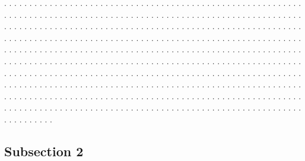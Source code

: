 \documentclass[twocolumn]{revtex4}
\begin{document}
. . . . . . . . . . . . . . . . . . . . . . . . . . . . . . . . . . . . . . . .
. . . . . . . . . . . . . . . . . . . . . . . . . . . . . . . . . . . . . . . .
. . . . . . . . . . . . . . . . . . . . . . . . . . . . . . . . . . . . . . . .
. . . . . . . . . . . . . . . . . . . . . . . . . . . . . . . . . . . . . . . .
. . . . . . . . . . . . . . . . . . . . . . . . . . . . . . . . . . . . . . . .
. . . . . . . . . . . . . . . . . . . . . . . . . . . . . . . . . . . . . . . .
. . . . . . . . . . . . . . . . . . . . . . . . . . . . . . . . . . . . . . . .
. . . . . . . . . . . . . . . . . . . . . . . . . . . . . . . . . . . . . . . .
. . . . . . . . . . . . . . . . . . . . . . . . . . . . . . . . . . . . . . . .
. . . . . . . . . . . . . . . . . . . . . . . . . . . . . . . . . . . . . . . .
. . . . . . . . . . . . . . . . . . . . . . . . . . . . . . . . . . . . . . . .
. . . . . . . . . . . . . . . . . . . . . . . . . . . . . . . . . . . . . . . .
. . . . . . . . . . . . . . . . . . . . . . . . . . . . . . . . . . . . . . . .
. . . . . . . . . . . . . . . . . . . . . . . . . . . . . . . . . . . . . . . .
. . . . . . . . . . . . . . . . . . . . . . . . . . . . . . . . . . . . . . . .

\subsection{Subsection 2}
\end{document}
